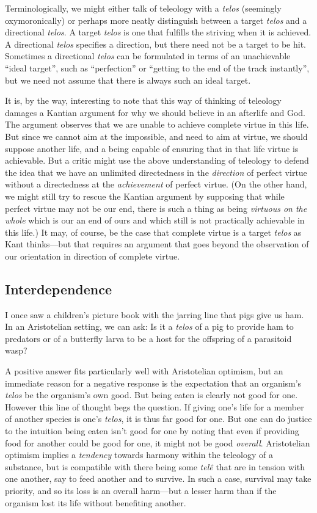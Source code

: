 Terminologically, we might either talk of teleology with a \textit{telos} (seemingly oxymoronically) or perhaps
more neatly distinguish between a target \textit{telos} and a directional \textit{telos}. A target \textit{telos} is
one that fulfills the striving when it is achieved. A directional \textit{telos} specifies a direction, but there need
not be a target to be hit. Sometimes a directional \textit{telos} can be formulated in terms of an unachievable 
``ideal target'', such as ``perfection'' or ``getting to the end of the track instantly'', but we need not assume
that there is always such an ideal target.

It is, by the way, interesting to note that this way of thinking of teleology damages a Kantian argument for why we should believe in 
an afterlife and God. The argument observes that we are unable to achieve complete virtue in this life. But since we cannot aim at
the impossible, and need to aim at virtue, we should suppose another life, and a being capable of ensuring that in that life virtue
is achievable. But a critic might use the above understanding of teleology to defend the idea that we have an unlimited 
directedness in the \textit{direction} of perfect virtue without a directedness at the \textit{achievement} of perfect virtue. (On the other 
hand, we might still try to rescue the Kantian argument by supposing that while perfect virtue may not be our end, 
there is such a thing as being \textit{virtuous on the whole} which is our an end of ours and which still is not
practically achievable in this life.) It may, of course, be the case that complete virtue is a target \textit{telos} as
Kant thinks---but that requires an argument that goes beyond the observation of our orientation in direction of
complete virtue.

\subsection{Interdependence}
I once saw a children's picture book with the
jarring line that pigs give us ham. In an Aristotelian setting, we can ask: Is it a \textit{telos} of a pig
to provide ham to predators or of a butterfly larva to be a host for the offspring of a parasitoid wasp? 

A positive answer fits particularly well with Aristotelian optimism, but an immediate reason for a negative 
response is the expectation that an organism's \textit{telos} be the organism's
own good. But being eaten is clearly not good for one. However this line of thought begs the question. 
If giving one's life for a member of another species is one's \textit{telos}, it is thus far good for one.
But one can do justice to the intuition being eaten isn't good for one by noting that even if providing
food for another could be good for one, it might not be good \textit{overall}. Aristotelian optimism 
implies a \textit{tendency} towards harmony within the teleology of a substance, but is compatible with
there being some \textit{tel\^e} that are in tension with one another, say to feed another and to survive.
In such a case, survival may take priority, and so its loss is an overall harm---but a lesser harm than if
the organism lost its life without benefiting another. 

